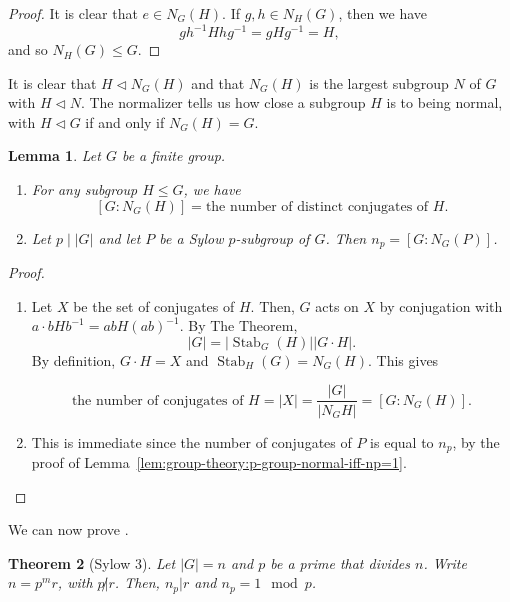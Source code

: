 \documentclass[12pt]{report}
\newcommand{\Stab}{\operatorname{Stab}}
\newtheorem{theorem}{Theorem}[section] %
\newtheorem{lemma}[theorem]{Lemma}
\theoremstyle{definition}
\begin{document}
\begin{proof}
  It is clear that \(e \in N_{G}(H)\). If \(g,h \in N_{H}(G)\), then we have
  \[gh^{-1}H hg^{-1} = gHg^{-1} = H,\]
  and so \(N_{H}(G) \leq G\).
\end{proof}

It is clear that \(H \triangleleft N_{G}(H)\) and that \(N_{G}(H)\) is the largest subgroup \(N\) of \(G\) with \(H \triangleleft N\). The normalizer tells us how close a subgroup \(H\) is to being normal, with \(H \triangleleft G\) if and only if \(N_{G}(H) = G\).

\begin{lemma}
  Let \(G\) be a finite group.

  \begin{enumerate}
    \item For any subgroup \(H \leq G\), we have
      \[[G:N_{G}(H)] = \text{the number of distinct conjugates of } H.\]
    \item Let \(p \mid |G|\) and let \(P\) be a Sylow \(p\)-subgroup of \(G\). Then \(n_{p} = [G:N_{G}(P)]\).
    \end{enumerate}
\end{lemma}

\begin{proof}
  \begin{enumerate}
  \item Let \(X\) be the set of conjugates of \(H\). Then, \(G\) acts on \(X\) by conjugation with \(a \cdot bHb^{-1} = abH(ab)^{-1}\). By The  Theorem,
    \[|G| = |\Stab_{G}(H)| |G\cdot H|.\]
    By definition, \(G \cdot H = X\) and \(\Stab_{H}(G) = N_{G}(H)\). This gives

    \[\text{the number of conjugates of } H = |X| = \frac{|G|}{|N_{G}H|} = [G : N_{G}(H)].\]

  \item This is immediate since the number of conjugates of \(P\) is equal to \(n_{p}\), by the proof of Lemma~\ref{lem:group-theory:p-group-normal-iff-np=1}.
  \end{enumerate}
\end{proof}

We can now prove .

\begin{theorem}[Sylow 3]\label{thm:group-theory:Sylow-3}
  Let \(|G| = n\) and \(p\) be a prime that divides \(n\). Write \(n = p^{m}r\), with \(p \not| r\). Then, \(n_{p} | r\) and \(n_{p} = 1 \mod p\).
\end{theorem}
\end{document}
